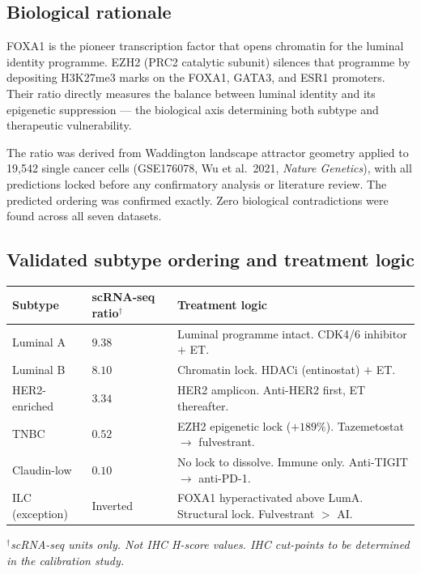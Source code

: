 \documentclass[11pt, a4paper]{article}
\begin{document}
\subsection{Biological rationale}

FOXA1 is the pioneer transcription factor
that opens chromatin for the luminal identity
programme. EZH2 (PRC2 catalytic subunit)
silences that programme by depositing H3K27me3
marks on the FOXA1, GATA3, and ESR1 promoters.
Their ratio directly measures the balance
between luminal identity and its epigenetic
suppression --- the biological axis determining
both subtype and therapeutic vulnerability.

The ratio was derived from Waddington landscape
attractor geometry applied to 19,542 single
cancer cells (GSE176078, Wu et al.\ 2021,
\textit{Nature Genetics}), with all predictions
locked before any confirmatory analysis or
literature review. The predicted ordering
was confirmed exactly. Zero biological
contradictions were found across all seven
datasets.

\subsection{Validated subtype ordering and
treatment logic}

\begin{center}
\begin{tabular}{p{2.2cm}p{1.7cm}p{8.3cm}}
\toprule
\textbf{Subtype} &
\textbf{scRNA-seq ratio$^{\dagger}$} &
\textbf{Treatment logic} \\
\midrule
Luminal A & $9.38$ &
Luminal programme intact.
CDK4/6 inhibitor $+$ ET. \\[0.3em]
Luminal B & $8.10$ &
Chromatin lock.
HDACi (entinostat) $+$ ET. \\[0.3em]
HER2-enriched & $3.34$ &
HER2 amplicon.
Anti-HER2 first, ET thereafter. \\[0.3em]
TNBC & $0.52$ &
EZH2 epigenetic lock ($+189\%$).
Tazemetostat $\rightarrow$ fulvestrant. \\[0.3em]
Claudin-low & $0.10$ &
No lock to dissolve.
Immune only.
Anti-TIGIT $\rightarrow$ anti-PD-1. \\[0.3em]
ILC (exception) &
Inverted &
FOXA1 hyperactivated above LumA.
Structural lock. Fulvestrant $>$ AI. \\
\bottomrule
\end{tabular}
\end{center}

\small $^{\dagger}$\textit{scRNA-seq units
only. Not IHC H-score values. IHC cut-points
to be determined in the calibration study.}
\normalsize
\end{document}
